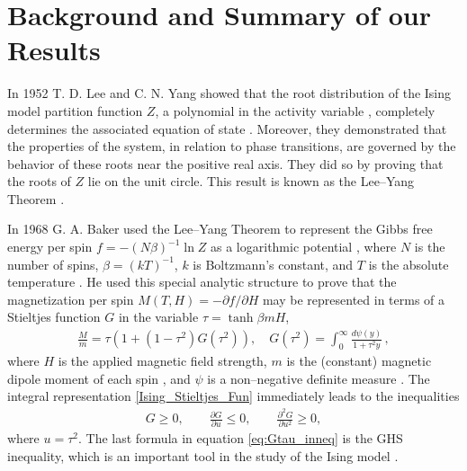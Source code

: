 \documentclass[english,12pt,jmp,graphicx]{revtex4-1}
\begin{document}
\section{Background and Summary of our Results}\label{sec:Background}
%
In 1952 T. D. Lee and C. N. Yang showed that the root distribution of
the Ising model partition function $Z$, a polynomial in the activity
variable \cite{Lee:PR:411,Baker-1990,Ruelle-1969,Ruelle:AM:589},
completely determines the associated equation of state
\cite{Yang:PR:404}. Moreover, they demonstrated that the properties of 
the system, in relation to phase transitions, are governed by the
behavior of these roots near the positive real axis. They did so by
proving that the roots of $Z$ lie on the unit circle. This result is
known as the Lee--Yang Theorem \cite{Lee:PR:411,Ruelle-1969}.   

In 1968 G. A. Baker used the Lee--Yang Theorem to represent the Gibbs
free energy per spin $f=-(N\beta)^{-1}\ln{Z}$ as a logarithmic potential
\cite{Saff_Totik:97}, where $N$ is the number of spins, $\beta=(kT)^{-1}$,
$k$ is Boltzmann's constant, and $T$ is the absolute temperature
\cite{Baker:PRL-990}. He used this special analytic structure to prove
that the magnetization per spin $M(T,H)=-\partial f/\partial H$
\cite{Robertson-1993} may be represented in terms of a Stieltjes
function $G$ in the variable $\tau=\tanh{\beta mH}$,          
%
\begin{align}\label{Ising_Stieltjes_Fun}
  \frac{M}{m} =\tau(1+(1-\tau^2)G(\tau^2)), \quad
  G(\tau^2)=\int_0^\infty\frac{d\psi(y)}{1+\tau^2y}\,, %
\end{align}
%
where $H$ is the applied magnetic field strength, $m$ is the
(constant) magnetic dipole moment of each spin \cite{Griffiths-1999},
and $\psi$ is a non--negative definite measure \cite{Baker:PRL-990,Baker-1990}. The
integral representation \eqref{Ising_Stieltjes_Fun} immediately leads
to the inequalities    
%
\begin{align}\label{eq:Gtau_inneq}
  G\geq0, \qquad \frac{\partial G}{\partial u}\leq0, \qquad \frac{\partial^2G}{\partial u^2}\geq0,
\end{align}
%
where $u=\tau^2$. The last formula in equation \eqref{eq:Gtau_inneq} is
the GHS inequality, which is an important tool in the study of the
Ising model \cite{Golden:JMP-5627}. 
\end{document}
